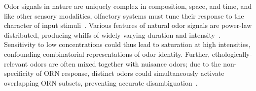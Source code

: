 
Odor signals in nature are uniquely complex in composition, space, and time, and like other sensory modalities, olfactory systems must tune their response to the character of input stimuli~\cite{murlis_odor_plumes, fluid_dynamics_chemosensory, celani, carde_navigation, srinivas_elife}. Various features of natural odor signals are power-law distributed, producing whiffs of widely varying duration and intensity~\cite{celani}. Sensitivity to low concentrations could thus lead to saturation at high intensities, confounding combinatorial representations of odor identity. Further, ethologically-relevant odors are often mixed together with nuisance odors; due to the non-specificity of ORN response, distinct odors could simultaneously activate overlapping ORN subsets, preventing  accurate disambiguation~\cite{odor_backgrounds}. 

